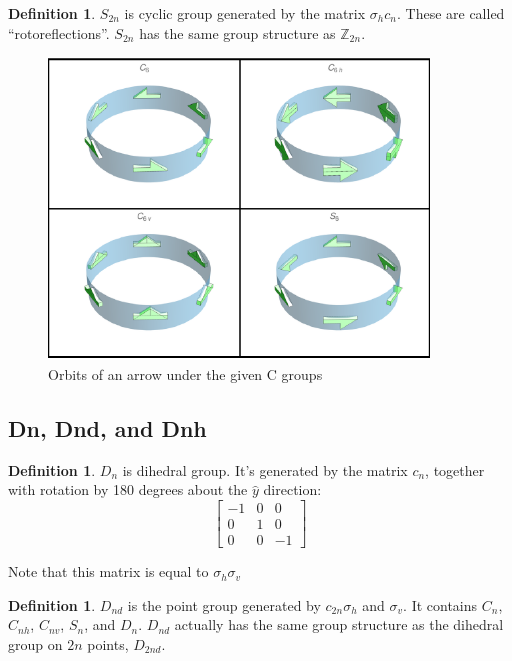 \documentclass[12pt, letterpaper]{article}
\theoremstyle{definition} %
\newtheorem{defn}[thm]{Definition} %
\begin{document}
\begin{defn}
  $S_{2n}$ is cyclic group generated by the matrix $\sigma_hc_n$. These are called ``rotoreflections''.
$S_{2n}$ has the same group structure as $\mathbb{Z}_{2n}$.
\end{defn}

\begin{figure}[H]
\centering
\includegraphics[width=0.9\textwidth]{figureCS}
\caption{Orbits of an arrow under the given C groups}

\label{figure-cs}
\end{figure}

\subsection{Dn, Dnd, and Dnh}
\begin{defn}
  $D_{n}$ is dihedral group. It's generated by the matrix $c_n$, together with rotation by 180 degrees about the $\hat{y}$ direction:
  \begin{equation*}
  \begin{bmatrix}
    -1 & 0 & 0 \\ 0 & 1 & 0 \\ 0 & 0 & -1
  \end{bmatrix}
\end{equation*}

  Note that this matrix is equal to $\sigma_h\sigma_v$
\end{defn}

\begin{defn}
  $D_{nd}$ is the point group generated by $c_{2n}\sigma_h$ and $\sigma_v$. It contains $C_n$, $C_{nh}$, $C_{nv}$, $S_{n}$, and $D_n$.
  $D_{nd}$ actually has the same group structure as the dihedral group on $2n$ points, $D_{2nd}$.
\end{defn}
\end{document}
